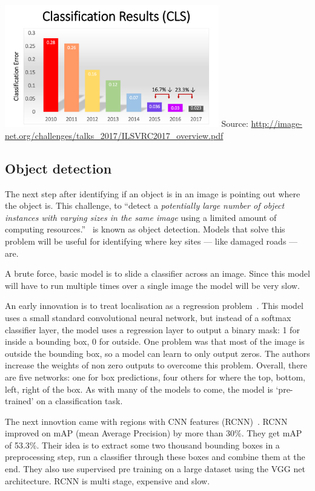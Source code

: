 \documentclass[12pt, a4paper, oneside, headinclude, footinclude]{article}
\begin{document}
\includegraphics[width=0.7\textwidth]{imagenet_classification_results.png}
Source: \url{http://image-net.org/challenges/talks\_2017/ILSVRC2017\_overview.pdf}

\subsection{Object detection}

The next step after identifying if an object is in an image is pointing out
where the object is. This challenge, to ``detect a \textit{potentially large
number of object instances with varying sizes in the same image} using a
limited amount of computing resources.''~\cite[Their emphasis]{NIPS2013_5207}
is known as object detection. Models that solve this problem will be useful for identifying
where key sites --- like damaged roads --- are.

A brute force, basic model is to slide a classifier across an image. Since
this model will have to run multiple times over a single image the model will
be very slow. 

An early innovation is to treat localisation as a regression
problem~\cite{NIPS2013_5207}. This model uses a small standard convolutional
neural network, but instead of a softmax classifier layer, the model uses a
regression layer to output a binary mask: 1 for inside a bounding box, 0 for
outside. One problem was that most of the image is outside the bounding box,
so a model can learn to only output zeros. The authors increase the weights of
non zero outputs to overcome this problem. Overall, there are five networks:
one for box predictions, four others for where the {top, bottom, left, right}
of the box. As with many of the models to come, the model is `pre-trained' on
a classification task. 

The next innovtion came with regions with CNN features
(RCNN)~\cite{Girshick2014, Girshick2015}. RCNN improved on mAP (mean Average
Precision) by more than 30\%. They get mAP of 53.3\%. Their idea is to extract
some two thousand bounding boxes in a preprocessing step, run a classifier
through these boxes and combine them at the end. They also use supervised pre
training on a large dataset using the VGG net architecture. RCNN is multi
stage, expensive and slow. 
\end{document}

